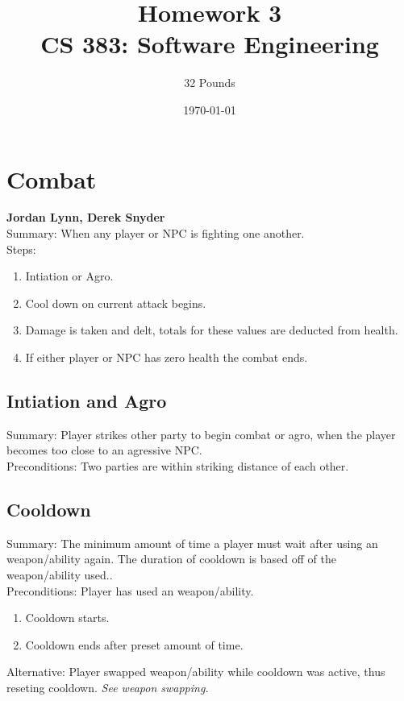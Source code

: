 \documentclass[12pt]{report}
\begin{document}
\title{Homework 3\\ \vspace{2 mm} {\large CS 383: Software Engineering}}

\author{32 Pounds}
\date{\today}
\maketitle
\clearpage

\chapter{Combat}
\textbf{Jordan Lynn, Derek Snyder} \\
Summary: When any player or NPC is fighting one another.\\
    
    Steps:
    \begin{enumerate}
        \item Intiation or Agro.
        \item Cool down on current attack begins.
        \item Damage is taken and delt, totals for these values are deducted from health.
        \item If either player or NPC has zero health the combat ends.
    \end{enumerate}
    
    \section{Intiation and Agro}
    Summary: Player strikes other party to begin combat or agro, when the player becomes too close to an agressive NPC.\\
    Preconditions: Two parties are within striking distance of each other. %
    
    \section{Cooldown}
    Summary: The minimum amount of time a player must wait after using an weapon/ability again. The duration of cooldown is based off of the weapon/ability used..\\ %
    Preconditions: Player has used an weapon/ability.\\
    
    \begin{enumerate}
        \item Cooldown starts.
        \item Cooldown ends after preset amount of time.
    \end{enumerate}
    Alternative: Player swapped weapon/ability while cooldown was active, thus reseting cooldown. \textit{See weapon swapping.}
\end{document}
